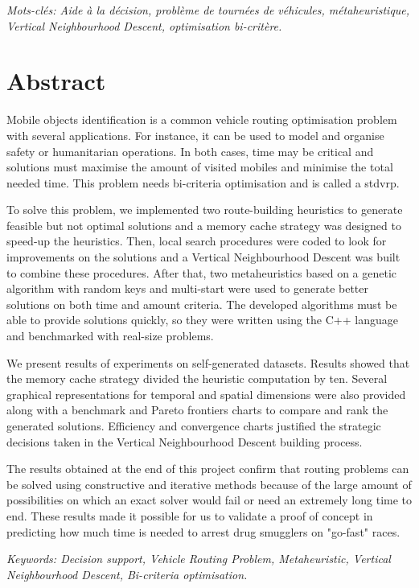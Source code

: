 \emph{Mots-clés: Aide à la décision, problème de tournées de véhicules, métaheuristique, Vertical Neighbourhood Descent, optimisation bi-critère.}

\newpage
\section*{Abstract}

Mobile objects identification is a common vehicle routing optimisation problem with several applications. For instance, it can be used to model and organise safety or humanitarian operations. In both cases, time may be critical and solutions must maximise the amount of visited mobiles and minimise the total needed time. This problem needs bi-criteria optimisation and is called a \acrlong{stdvrp}.
 
To solve this problem, we implemented two route-building heuristics to generate feasible but not optimal solutions and a memory cache strategy was designed to speed-up the heuristics. Then, local search procedures were coded to look for improvements on the solutions and a Vertical Neighbourhood Descent was built to combine these procedures. After that, two metaheuristics based on a genetic algorithm with random keys and multi-start were used to generate better solutions on both time and amount criteria. The developed algorithms must be able to provide solutions quickly, so they were written using the C++ language and benchmarked with real-size problems. 

We present results of experiments on self-generated datasets. Results showed that the memory cache strategy divided the heuristic computation by ten. Several graphical representations for temporal and spatial dimensions were also provided along with a benchmark and Pareto frontiers charts to compare and rank the generated solutions. Efficiency and convergence charts justified the strategic decisions taken in the Vertical Neighbourhood Descent building process. 

The results obtained at the end of this project confirm that routing problems can be solved using constructive and iterative methods because of the large amount of possibilities on which an exact solver would fail or need an extremely long time to end. These results made it possible for us to validate a proof of concept in predicting how much time is needed to arrest drug smugglers on "go-fast" races.

\emph{Keywords: Decision support, Vehicle Routing Problem, Metaheuristic, Vertical Neighbourhood Descent, Bi-criteria optimisation.}
